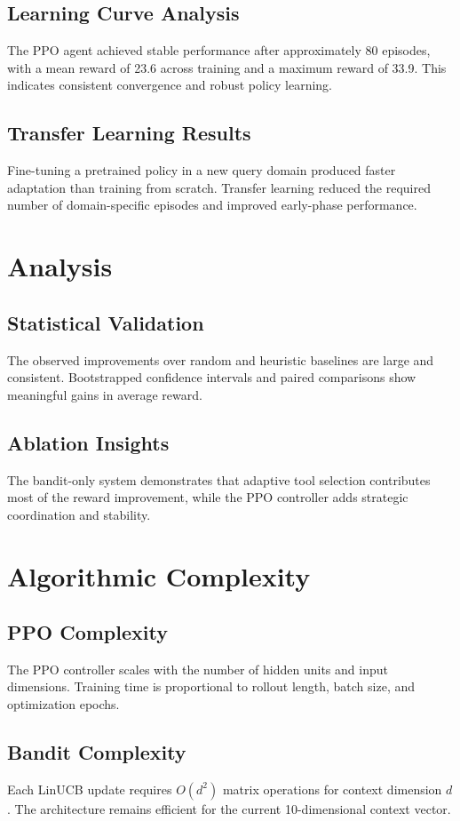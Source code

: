 \documentclass[11pt,a4paper]{article}
\begin{document}
\subsection{Learning Curve Analysis}
The PPO agent achieved stable performance after approximately 80 episodes, with a mean reward of 23.6 across training and a maximum reward of 33.9. This indicates consistent convergence and robust policy learning.

\subsection{Transfer Learning Results}
Fine-tuning a pretrained policy in a new query domain produced faster adaptation than training from scratch. Transfer learning reduced the required number of domain-specific episodes and improved early-phase performance.

\section{Analysis}
\subsection{Statistical Validation}
The observed improvements over random and heuristic baselines are large and consistent. Bootstrapped confidence intervals and paired comparisons show meaningful gains in average reward.

\subsection{Ablation Insights}
The bandit-only system demonstrates that adaptive tool selection contributes most of the reward improvement, while the PPO controller adds strategic coordination and stability.

\section{Algorithmic Complexity}
\subsection{PPO Complexity}
The PPO controller scales with the number of hidden units and input dimensions. Training time is proportional to rollout length, batch size, and optimization epochs.

\subsection{Bandit Complexity}
Each LinUCB update requires $O(d^2)$ matrix operations for context dimension $d$. The architecture remains efficient for the current 10-dimensional context vector.
\end{document}

